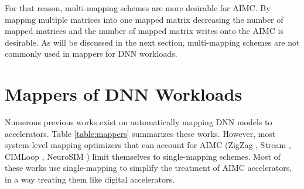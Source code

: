 For that reason, multi-mapping schemes are more desirable for AIMC. By mapping multiple matrices into one mapped matrix decreasing the number of mapped matrices and the number of mapped matrix writes onto the AIMC is desirable. As will be discussed in the next section, multi-mapping schemes are not commonly used in mappers for DNN workloads.

\section{Mappers of DNN Workloads}

Numerous previous works exist on automatically mapping DNN models to accelerators. Table \ref{table:mappers} summarizes these works. However, most system-level mapping optimizers that can account for AIMC (ZigZag \cite{mei2021zigzag}, Stream \cite{symons2024stream}, CIMLoop \cite{andrulis2024cimloop}, NeuroSIM \cite{chen2018neurosim}) limit themselves to single-mapping schemes. Most of these works use single-mapping to simplify the treatment of AIMC accelerators, in a way treating them like digital accelerators. 

